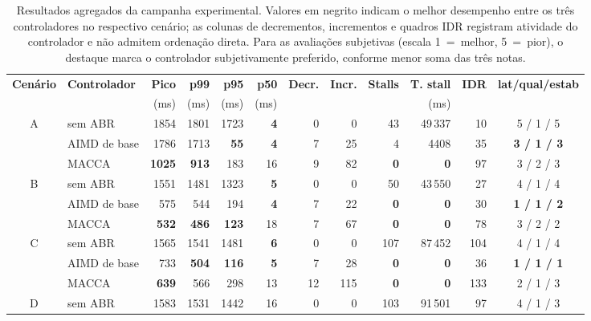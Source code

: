 \documentclass[conference]{IEEEtran}
\begin{document}
\begin{table}[!t]
  \caption{Resultados agregados da campanha experimental.
  Valores em negrito indicam o melhor desempenho entre os três
  controladores no respectivo cenário; as colunas de
  decrementos, incrementos e quadros IDR registram atividade do
  controlador e não admitem ordenação direta. Para as
  avaliações subjetivas (escala 1~=~melhor, 5~=~pior), o
  destaque marca o controlador subjetivamente preferido,
  conforme menor soma das três notas.}
  \label{tab:results-full}
  \centering
  \footnotesize
  \begin{tabular}{cl rrrr rr rr r c}
    \toprule
    \textbf{Cenário} & \textbf{Controlador} &
    \textbf{Pico} & \textbf{p99} & \textbf{p95} & \textbf{p50} &
    \textbf{Decr.} & \textbf{Incr.} &
    \textbf{Stalls} & \textbf{T. stall} & \textbf{IDR} &
    \textbf{lat/qual/estab} \\
    & & (ms) & (ms) & (ms) & (ms) & & & & (ms) & & \\
    \midrule
    \multirow{3}{*}{A} & sem ABR     & 1854 & 1801 & 1723 & \textbf{4} & 0 & 0 & 43 & 49\,337 & 10 & 5 / 1 / 5 \\
                      & AIMD de base & 1786 & 1713 & \textbf{55} & \textbf{4} & 7 & 25 & 4 & 4408 & 35 & \textbf{3 / 1 / 3} \\
                      & MACCA   & \textbf{1025} & \textbf{913} & 183 & 16 & 9 & 82 & \textbf{0} & \textbf{0} & 97 & 3 / 2 / 3 \\
    \midrule
    \multirow{3}{*}{B} & sem ABR     & 1551 & 1481 & 1323 & \textbf{5} & 0 & 0 & 50 & 43\,550 & 27 & 4 / 1 / 4 \\
                      & AIMD de base & 575 & 544 & 194 & \textbf{4} & 7 & 22 & \textbf{0} & \textbf{0} & 30 & \textbf{1 / 1 / 2} \\
                      & MACCA   & \textbf{532} & \textbf{486} & \textbf{123} & 18 & 7 & 67 & \textbf{0} & \textbf{0} & 78 & 3 / 2 / 2 \\
    \midrule
    \multirow{3}{*}{C} & sem ABR     & 1565 & 1541 & 1481 & \textbf{6} & 0 & 0 & 107 & 87\,452 & 104 & 4 / 1 / 4 \\
                      & AIMD de base & 733 & \textbf{504} & \textbf{116} & \textbf{5} & 7 & 28 & \textbf{0} & \textbf{0} & 36 & \textbf{1 / 1 / 1} \\
                      & MACCA   & \textbf{639} & 566 & 298 & 13 & 12 & 115 & \textbf{0} & \textbf{0} & 133 & 2 / 1 / 3 \\
    \midrule
    \multirow{3}{*}{D} & sem ABR     & 1583 & 1531 & 1442 & 16 & 0 & 0 & 103 & 91\,501 & 97 & 4 / 1 / 3 \\

\end{tabular}
\end{table}
\end{document}
